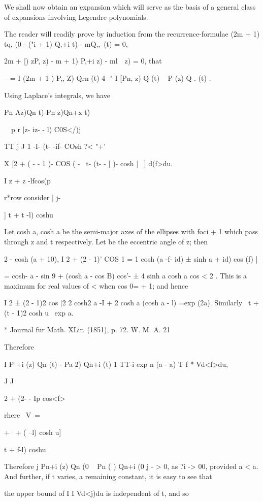 {{{We shall now obtain an expansion which will serve as the basis of a
general class of expansions involving Legendre polynomials.

The reader will readily prove by induction from the
recurrence-formulae (2m + 1) tq, (0 - ("i + 1) Q,+i t) - mQ,,\, (t)
= 0,

 2m + [) zP, z) - m + 1) P,+i z) - ml\ \, z) = 0, that

-- = I (2m + 1 ) P,, Z) Qrn (t) 4- " I [Pn, z) Q (t) ~ P (z) Q . (t)
.

Using Laplace's integrals, we have

Pn Az)Qn t)-Pn z)Qn+x t)

\ \ p r [z- iz- - l) C0S</)j

TT j J 1 -I- (t- -if- COsh ?< "+'

X [2 + ( - - 1 )- COS ( - \ t- (t- - ] )- cosh |~ ] d(f>du.

I z + z -lfcos(p

r*row consider | j-

] t + t -l) coshu

Let cosh a, cosh a be the semi-major axes of the ellipses with foci +
1 which pass through z and t respectively. Let be the eccentric angle
of z; then

2 - cosh (a + 10), I 2 + (2 - 1)' COS 1 = 1 cosh (a -f- id) ± sinh a +
id) cos (f) |

= cosh- a - sin 9 + (cosh a - cos B) cos'- ± 4 sinh a cosh a cos < 2 .
This is a maximum for real values of < when cos 0= + 1; and hence

I 2 ± (2 - 1)2 cos |2 2 cosh2 a -I + 2 cosh a (cosh a - l) =exp (2a).
Similarly \ t + (t - 1)2 cosh u \ exp a.

* Journal fur Math. XLir. (1851), p. 72. W. M. A. 21

%
%

Therefore

I P +i (z) Qn (t) - Pa 2) Qn+i (t) 1 TT-i exp n (a - a) T f * Vd<f>du,

J J

2 + (2- - Ip cos<f>

rhere \ V\ =

+ \ + ( --l) cosh u]

t + f-l) coshu

Therefore j Pn+i (z) Qn (0 ~ Pn ( ) Qn+i (0 j - > 0, as ?i -> 00,
provided a < a. And further, if t varies, a remaining constant, it is
easy to see that

the upper bound of I I Vd<j)du is independent of t, and so

}}}
